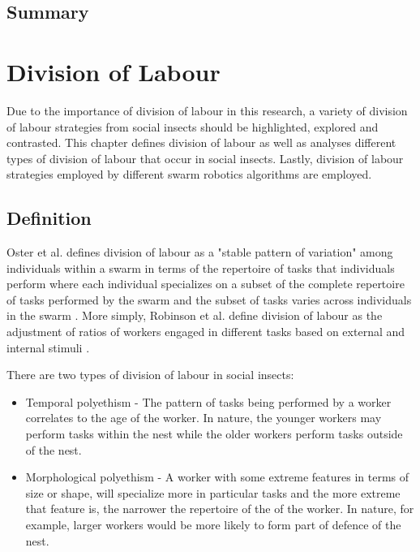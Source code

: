 \section{Summary}
\label{sec:second:summary}

%
%

\chapter{Division of Labour}
\label{chap:divisionoflabour}

Due to the importance of division of labour in this research, a variety of division of labour strategies from social insects should be highlighted, explored and contrasted. This chapter defines division of labour as well as analyses different types of division of labour that occur in social insects. Lastly, division of labour strategies employed by different swarm robotics algorithms are employed. 

\section{Definition}
\label{sec:second:definition}

Oster et al. defines division of labour as a "stable pattern of variation" among individuals within a swarm in terms of the repertoire of tasks that individuals perform where each individual specializes on a subset of the complete repertoire of tasks performed by the swarm and the subset of tasks varies across individuals in the swarm \cite{oster1978caste}.  
More simply, Robinson et al. define division of labour as the adjustment of ratios of workers engaged in different tasks based on external and internal stimuli \cite{robinson1992regulation}.

There are two types of division of labour in social insects: 
\begin{itemize}
	\item Temporal polyethism - The pattern of tasks being performed by a worker correlates to the age of the worker. In nature, the younger workers may perform tasks within the nest while the older workers perform tasks outside of the nest.
	\item Morphological polyethism - A worker with some extreme features in terms of size or shape, will specialize more in particular tasks and the more extreme that feature is, the narrower the repertoire of the of the worker. In nature, for example, larger workers would be more likely to form part of defence of the nest. \cite{beshers2001models}
\end{itemize}

